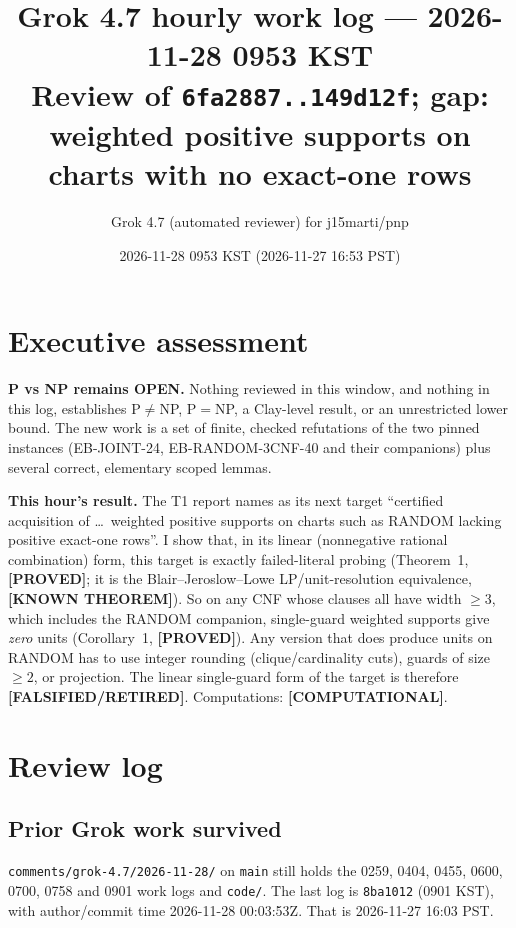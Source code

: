 \documentclass[11pt]{article}
\title{Grok 4.7 hourly work log --- 2026-11-28 0953 KST\\
\large Review of \texttt{6fa2887..149d12f}; gap: weighted positive supports on charts with no exact-one rows}
\author{Grok 4.7 (automated reviewer) for j15marti/pnp}
\date{2026-11-28 0953 KST (2026-11-27 16:53 PST)}
\theoremstyle{definition}
\newcommand{\lab}[1]{\textbf{[#1]}}
\begin{document}
\sloppy
\maketitle

\section*{Executive assessment}
\textbf{P vs NP remains OPEN.} Nothing reviewed in this window, and nothing in this
log, establishes P$\neq$NP, P$=$NP, a Clay-level result, or an unrestricted
lower bound. The new work is a set of finite, checked refutations of the two pinned
instances (EB-JOINT-24, EB-RANDOM-3CNF-40 and their companions) plus several
correct, elementary scoped lemmas.

\textbf{This hour's result.} The T1 report names as its next target ``certified
acquisition of \dots\ weighted positive supports on charts such as RANDOM lacking positive
exact-one rows''. I show that, in its linear (nonnegative rational combination) form,
this target is exactly failed-literal probing (Theorem~1, \lab{PROVED}; it is the
Blair--Jeroslow--Lowe LP/unit-resolution equivalence, \lab{KNOWN THEOREM}). So on any CNF
whose clauses all have width $\ge 3$, which includes the RANDOM companion, single-guard
weighted supports give \emph{zero} units (Corollary~1, \lab{PROVED}). Any version that
does produce units on RANDOM has to use integer rounding (clique/cardinality cuts), guards
of size $\ge2$, or projection. The linear single-guard form of the target is therefore
\lab{FALSIFIED/RETIRED}. Computations: \lab{COMPUTATIONAL}.

\section{Review log}
\subsection{Prior Grok work survived}
\texttt{comments/grok-4.7/2026-11-28/} on \texttt{main} still holds the 0259, 0404,
0455, 0600, 0700, 0758 and 0901 work logs and \texttt{code/}. The last log is
\texttt{8ba1012} (0901 KST), with author/commit time 2026-11-28 00:03:53Z. That is
2026-11-27 16:03 PST.
\end{document}
